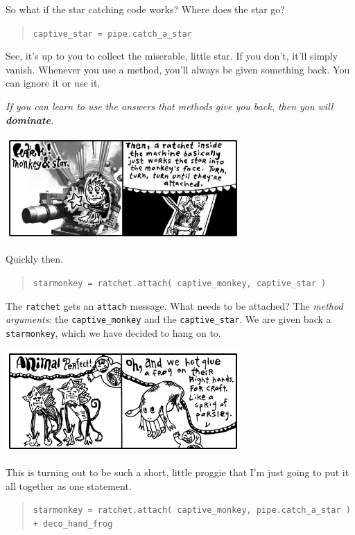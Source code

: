 \documentclass[10pt,twoside]{report}
\begin{document}
So what if the star catching code works?  Where does the star go?

\begin{quote}
\lstinline[breaklines=true]|captive_star = pipe.catch_a_star|\end{quote}


See, it's up to you to collect the miserable, little star.  If you
don't, it'll simply vanish. Whenever you use a method, you'll always
be given something back.  You can ignore it or use it.

{\em If you can learn to use the answers that methods give you back,
  then you will {\bf dominate}.}

	\includegraphics[width=0.6725\textwidth]{cache/25.png}

Quickly then.

\begin{quote}
\lstinline[breaklines=true]|starmonkey = ratchet.attach( captive_monkey, captive_star )|\end{quote}


The \lstinline[breaklines=true]|ratchet| gets an
\lstinline[breaklines=true]|attach| message.  What needs to be
attached?  The {\em method arguments}: the
\lstinline[breaklines=true]|captive_monkey| and the
\lstinline[breaklines=true]|captive_star|.  We are given back a
\lstinline[breaklines=true]|starmonkey|, which we have decided to hang
on to.

	\includegraphics[width=0.6725\textwidth]{cache/26.png}

This is turning out to be such a short, little proggie that I'm just
going to put it all together as one statement.

\begin{quote}
\lstinline[breaklines=true]|starmonkey = ratchet.attach( captive_monkey, pipe.catch_a_star ) + deco_hand_frog|\end{quote}
\end{document}
